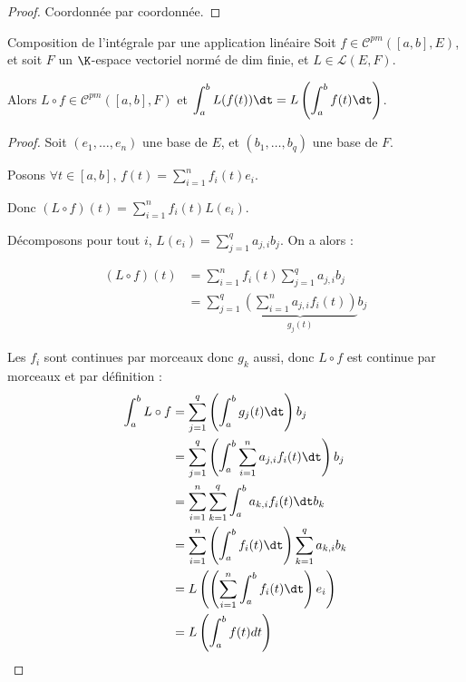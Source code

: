 \begin{proof}
    Coordonnée par coordonnée.
\end{proof}


\begin{theoreme}{Composition de l'intégrale par une application linéaire}{}
    Soit $f \in \mathscr C^{pm}([a, b], E)$, et soit $F$ un $\K$-espace vectoriel normé de dim finie, et 
    $L \in \mathscr L(E, F)$.

    Alors $L \circ f \in \mathscr C^{pm}([a, b], F)$ et $\displaystyle \int_a^b L(f(t)) \dt = L\left( \int_a^b f(t) \dt \right)$.
\end{theoreme}


\begin{proof}
    Soit $(e_1, \ldots, e_n)$ une base de $E$, et $(b_1, \ldots, b_q)$ une base de $F$.

    Posons $\displaystyle \forall t \in [a, b], \, f(t) = \sum_{i=1}^n f_i(t)e_i$.

    Donc $\displaystyle (L \circ f)(t) = \sum_{i=1}^n f_i(t)L(e_i)$.

    Décomposons pour tout $i$, $\displaystyle L(e_i) = \sum_{j=1}^q a_{j, i} b_j$.
    On a alors :

    \begin{align*}
        (L \circ f) (t) & = \sum_{i=1}^n f_i(t) \sum_{j=1}^q a_{j, i} b_j \\
        & = \sum_{j=1}^q \underbrace{\left( \sum_{i=1}^n a_{j, i} f_i(t) \right)}_{g_j(t)} b_j
    \end{align*}

    Les $f_i$ sont continues par morceaux donc $g_k$ aussi, donc $L \circ f$ est continue par morceaux et par définition : 
    {\allowdisplaybreaks
    \begin{align*}
        \int_a^b L \circ f & = \sum_{j=1}^q \left( \int_a^b g_j(t) \dt \right) b_j \\
        & = \sum_{j=1}^q \left( \int_a^b \sum_{i=1}^n a_{j, i} f_i(t) \dt \right) b_j \\
        & = \sum_{i = 1}^n \sum_{k = 1 }^{q } \int_{a }^{b } a_{k, i} f_i(t) \dt b_k \\
        & = \sum_{i=1}^n \left( \int_a^b f_i(t) \dt \right) \sum_{k=1}^q a_{k, i} b_k \\
        & = L \left(\left(\sum_{i = 1 }^{n } \int_{a }^{b } f_i(t) \dt\right) e_i\right) \\
        & = L \left( \int_a^b f(t) dt \right)
    \end{align*}
    }
\end{proof}

